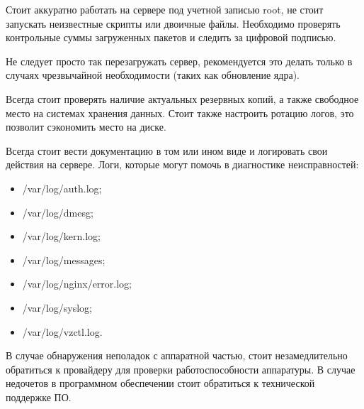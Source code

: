 Стоит аккуратно работать на сервере под учетной записью root, не стоит запускать неизвестные скрипты или двоичные файлы.
Необходимо проверять контрольные суммы загруженных пакетов и следить за цифровой подписью.

Не следует просто так перезагружать сервер, рекомендуется это делать только в случаях чрезвычайной необходимости (таких как обновление ядра).

Всегда стоит проверять наличие актуальных резервных копий, а также свободное место на системах хранения данных.
Стоит также настроить ротацию логов, это позволит сэкономить место на диске.

Всегда стоит вести документацию в том или ином виде и логировать свои действия на сервере.
Логи, которые могут помочь в диагностике неисправностей:
\begin{itemize}
  \item /var/log/auth.log;
  \item /var/log/dmesg;
  \item /var/log/kern.log;
  \item /var/log/messages;
  \item /var/log/nginx/error.log;
  \item /var/log/syslog;
  \item /var/log/vzctl.log.
\end{itemize}

В случае обнаружения неполадок с аппаратной частью, стоит незамедлительно обратиться к провайдеру для проверки работоспособности аппаратуры.
В случае недочетов в программном обеспечении стоит обратиться к технической поддержке ПО.

\clearpage